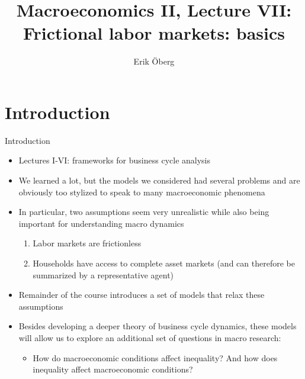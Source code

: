 \documentclass[9pt]{beamer}
\title[Frictional labor markets: basics]{Macroeconomics II, Lecture VII:\\
	 Frictional labor markets: basics}
\author{Erik {\"O}berg}
\date{}
\newcommand{\bit}{\begin{itemize}}
\newcommand{\eit}{\end{itemize}}
\newcommand{\ben}{\begin{enumerate}}
\newcommand{\een}{\end{enumerate}}
\begin{document}
\begin{frame}[plain]
\titlepage
\end{frame}

\section{Introduction}


\begin{frame}{Introduction}

\bit
\setlength\itemsep{1.5em}

\item Lectures I-VI: frameworks for business cycle analysis

\item We learned a lot, but the models we considered had several problems and are obviously too stylized to speak to many macroeconomic phenomena

\item In particular, two assumptions seem very unrealistic while also being important for understanding macro dynamics
\ben
\setlength\itemsep{0.5em}
	\item Labor markets are frictionless
	
	\item Households have access to complete asset markets (and can therefore be summarized by a representative agent)
\een 

\item Remainder of the course introduces a set of models that relax these assumptions

\item Besides developing a deeper theory of business cycle dynamics, these models will allow us to explore an additional set of questions in macro research:
\bit
\item How do macroeconomic conditions affect inequality? And how does inequality affect macroeconomic conditions?
\eit 

\eit

\end{frame}
\end{document}
